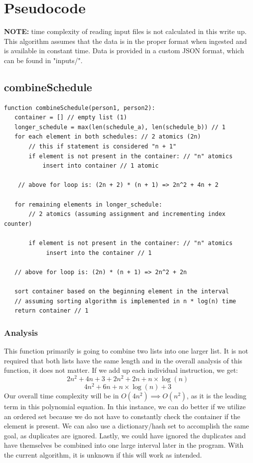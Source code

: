 \documentclass{article}
\begin{document}
\newpage

\section{Pseudocode}

\textbf{NOTE:} time complexity of reading input files is not calculated in this write up. 
This algorithm assumes that the data is in the proper format when ingested and is available in constant time.
Data is provided in a custom JSON format, which can be found in "inputs/".


\subsection{combineSchedule}

\begin{verbatim}
function combineSchedule(person1, person2):
   container = [] // empty list (1)
   longer_schedule = max(len(schedule_a), len(schedule_b)) // 1
   for each element in both schedules: // 2 atomics (2n)
       // this if statement is considered "n + 1"
       if element is not present in the container: // "n" atomics
           insert into container // 1 atomic

    // above for loop is: (2n + 2) * (n + 1) => 2n^2 + 4n + 2

   for remaining elements in longer_schedule: 
       // 2 atomics (assuming assignment and incrementing index counter)

       if element is not present in the container: // "n" atomics
            insert into the container // 1
   
   // above for loop is: (2n) * (n + 1) => 2n^2 + 2n

   sort container based on the beginning element in the interval
   // assuming sorting algorithm is implemented in n * log(n) time
   return container // 1

\end{verbatim}


\subsubsection{Analysis}

This function primarily is going to combine two lists into one larger list.
It is not required that both lists have the same length and in the overall analysis of this function, it does not matter.
If we add up each individual instruction, we get:
$$ 2n^{2} + 4n + 3 + 2n^{2} + 2n + n \times \log(n)$$
$$ 4n^{2} + 6n + n \times \log(n) + 3$$
Our overall time complexity will be in $O(4n^{2}) \implies O(n^{2})$, as it is the leading term in this polynomial equation.
In this instance, we can do better if we utilize an ordered set because we do not have to constantly check the container if the element is present.
We can also use a dictionary/hash set to accomplish the same goal, as duplicates are ignored.
Lastly, we could have ignored the duplicates and have themselves be combined into one large interval later in the program.
With the current algorithm, it is unknown if this will work as intended.
\end{document}
